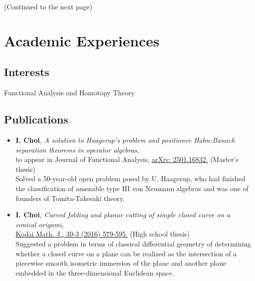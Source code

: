 \documentclass[11pt,a4paper]{article}
\begin{document}
\vfill\hfill(Continued to the next page)

\clearpage

\section*{Academic Experiences}


\subsection*{Interests}
\hspace{2em}
Functional Analysis and Homotopy Theory

\subsection*{Publications}
\begin{itemize}
\item
	\textbf{I. Choi},
	\emph{A solution to Haagerup's problem and positionve Hahn-Banach separation theorems in operator algebras},\\
	to appear in Journal of Functional Analysis, \href{https://arxiv.org/abs/2501.16832}{arXiv: 2501.16832.} (Master's thesis)\\[4pt]
	\faArrowRight\quad
	Solved a 50-year-old open problem posed by U. Haagerup, who had finished the classification of amenable type III von Neumann algebras and was one of founders of Tomita-Takesaki theory.
\item
	\textbf{I. Choi},
	\emph{Curved folding and planar cutting of simple closed curve on a conical origami},\\
	\href{https://projecteuclid.org/journals/kodai-mathematical-journal/volume-39/issue-3/Curved-folding-and-planar-cutting-of-simple-closed-curve-on/10.2996/kmj/1478073774.full}{Kodai Math. J., 39-3 (2016) 579-595.} (High school thesis)\\[4pt]
	\faArrowRight\quad
	Suggested a problem in terms of classical differential geometry of determining whether a closed curve on a plane can be realized as the intersection of a piecewise smooth isometric immersion of the plane and another plane embedded in the three-dimensional Euclidean space.
\end{itemize}
\end{document}
